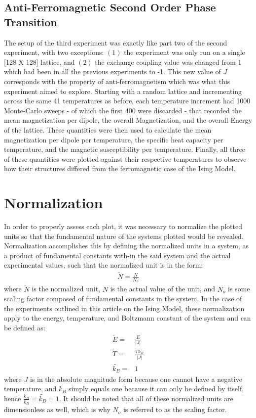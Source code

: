 \documentclass[twocolumn]{article}
\begin{document}
\subsection{Anti-Ferromagnetic Second Order Phase Transition}
\hspace{\parindent}The setup of the third experiment was exactly like part two of the second experiment, with two exceptions: $(1)$ the experiment was only run on a single [128 X 128] lattice, and $(2)$ the exchange coupling value was changed from 1 which had been in all the previous experiments to -1. This new value of $J$ corresponds with the property of anti-ferromagnetism which was what this experiment aimed to explore. Starting with a random lattice and incrementing across the same 41 temperatures as before, each temperature increment had 1000 Monte-Carlo sweeps - of which the first 400 were discarded - that recorded the mean magnetization per dipole, the overall Magnetization, and the overall Energy of the lattice. These quantities were then used to calculate the mean magnetization per dipole per temperature, the specific heat capacity per temperature, and the magnetic susceptibility per temperature. Finally, all three of these quantities were plotted against their respective temperatures to observe how their structures differed from the ferromagnetic case of the Ising Model.
\section{Normalization}
\hspace{\parindent}In order to properly assess each plot, it was necessary to normalize the plotted units so that the fundamental nature of the systems plotted would be revealed. Normalization accomplishes this by defining the normalized units in a system, as a product of fundamental constants with-in the said system and the actual experimental values, such that the normalized unit is in the form:
\begin{align}
\tilde{N} = \frac{N}{N_o}
\end{align}
where $\tilde{N}$ is the normalized unit, $N$ is the actual value of the unit, and $N_o$ is some scaling factor composed of fundamental constants in the system. In the case of the  experiments outlined in this article on the Ising Model, these normalization apply to the energy, temperature, and Boltzmann constant of the system and can be defined as:
\begin{align}
\tilde{E} =& \frac{E}{|J|} \\
\tilde{T} =& \frac{Tk_B}{|J|} \\
\tilde{k_B} =& 1
\end{align}
where $J$ is in the absolute magnitude form because one cannot have a negative temperature, and $k_B$ simply equals one because it can only be defined by itself, hence $\frac{k_B}{k_B}=\tilde{k_B}=1$. It should be noted that all of these normalized units are dimensionless as well, which is why $N_o$ is referred to as the scaling factor.
\end{document}
